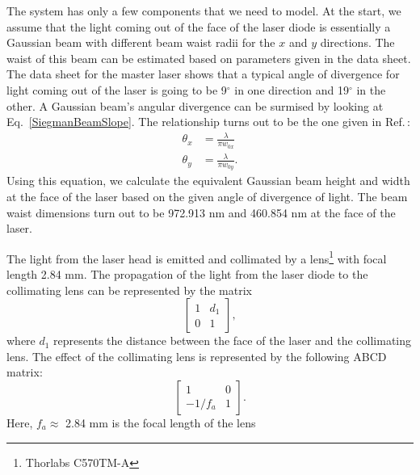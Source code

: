 The system has only a few components that we need to model. At the start, we assume that the light coming out of the face of the laser diode is essentially a Gaussian beam with different beam waist radii for the $x$ and $y$ directions. The waist of this beam can be estimated based on parameters given in the data sheet. The data sheet for the master laser shows that a typical angle of divergence for light coming out of the laser is going to be 9$^\circ$ in one direction and 19$^\circ$ in the other. A Gaussian beam's angular divergence can be surmised by looking at Eq.\ \ref{SiegmanBeamSlope}. The relationship turns out to be the one given in Ref.\,\cite{MellesGriotGaussian}:
\begin{align}
\theta_{x} &= \frac{\lambda}{\pi w_{0x}}\\
\theta_{y} &= \frac{\lambda}{\pi w_{0y}}.
\end{align}  
Using this equation, we calculate the equivalent Gaussian beam height and width at the face of the laser based on the given angle of divergence of light. The beam waist dimensions turn out to be 972.913 nm and 460.854 nm at the face of the laser.

The light from the laser head is emitted and collimated by a lens\footnote{Thorlabs C570TM-A} with focal length 2.84 mm.  %
The propagation of the light from the laser diode to the collimating lens can be represented by the matrix
\begin{equation}
\begin{bmatrix}\label{ABCD1}
1 & d_1 \\ 0 & 1
\end{bmatrix},
\end{equation}
where $d_1$ represents the distance between the face of the laser and the collimating lens. The effect of the collimating lens is represented by the following ABCD matrix:
\begin{equation}
\begin{bmatrix}\label{ABCD2}
1 & 0 \\ -1/f_{a} & 1
\end{bmatrix}.
\end{equation}
Here, $f_a\approx$ 2.84 mm is the focal length of the lens

